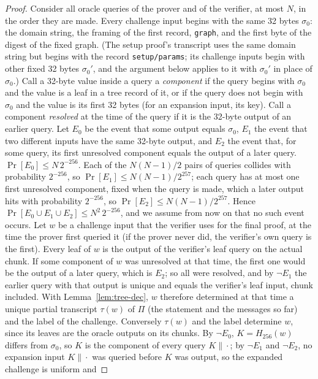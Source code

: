 \begin{proof}
Consider all oracle queries of the prover and of the verifier, at most $N$, in the order they are
made. Every challenge input begins with the same 32 bytes $\sigma_0$: the domain string, the
framing of the first record, \texttt{graph}, and the first byte of the digest of the fixed graph. (The setup proof's transcript
uses the same domain string but begins with the record \texttt{setup/params}; its challenge inputs begin with
other fixed 32 bytes $\sigma_0'$, and the argument below applies to it with $\sigma_0'$ in place of
$\sigma_0$.) Call a 32-byte value
inside a query a \emph{component} if the query begins with $\sigma_0$ and the value is a leaf in a
tree record of it, or if the query does not begin with $\sigma_0$ and the value is its first 32 bytes
(for an expansion input, its key). Call a component \emph{resolved} at the time of the query if it is
the 32-byte output of an earlier query.
Let $E_0$ be the event that some output equals $\sigma_0$, $E_1$ the event that two different inputs
have the same 32-byte output, and $E_2$ the event that, for some query, its first unresolved
component equals the output of a later query. $\Pr[E_0]\le N\,2^{-256}$. Each of the $N(N-1)/2$ pairs
of queries collides with probability $2^{-256}$, so $\Pr[E_1]\le N(N-1)/2^{257}$; each query has at
most one first unresolved component, fixed when the query is made, which a later output hits with
probability $2^{-256}$, so $\Pr[E_2]\le N(N-1)/2^{257}$. Hence $\Pr[E_0\cup E_1\cup E_2]\le
N^2\,2^{-256}$, and we assume from now on that no such event occurs.
Let $w$ be a challenge input that the verifier uses for the final proof, at the time the prover
first queried it (if the prover never did, the verifier's own query is the first). Every leaf of
$w$ is the output of the verifier's leaf query on the actual chunk. If some component of $w$ was
unresolved at that time, the first one would be the output of a later query, which is $E_2$; so all
were resolved, and by $\neg E_1$ the earlier query with that output is unique and equals the
verifier's leaf input, chunk included. With Lemma~\ref{lem:tree-dec}, $w$ therefore determined at
that time a unique partial transcript $\tau(w)$ of $\Pi$ (the statement and the messages so far)
and the label of the challenge. Conversely $\tau(w)$ and the label determine $w$, since its leaves
are the oracle outputs on its chunks. By $\neg E_0$, $K=H_{256}(w)$ differs from $\sigma_0$, so $K$
is the component of every query $K\|\cdot$; by $\neg E_1$ and $\neg E_2$, no expansion input
$K\|\cdot$ was queried before $K$ was output, so the expanded challenge is uniform and

\end{proof}
